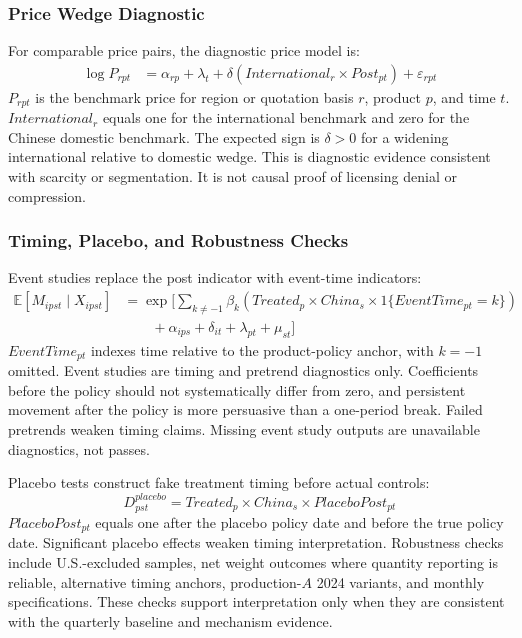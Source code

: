 \documentclass[12pt,a4paper]{article}
\numberwithin{equation}{section}
\begin{document}
\subsubsection{Price Wedge Diagnostic}

For comparable price pairs, the diagnostic price model is:
\begin{equation}
\begin{aligned}
\log P_{rpt}
&=\alpha_{rp}
+\lambda_t
+\delta\left(International_r\times Post_{pt}\right)
+\varepsilon_{rpt}
\end{aligned}
\end{equation}
\(P_{rpt}\) is the benchmark price for region or quotation basis \(r\), product \(p\), and time \(t\). \(International_r\) equals one for the international benchmark and zero for the Chinese domestic benchmark. The expected sign is \(\delta>0\) for a widening international relative to domestic wedge. This is diagnostic evidence consistent with scarcity or segmentation. It is not causal proof of licensing denial or compression.

\subsubsection{Timing, Placebo, and Robustness Checks}

Event studies replace the post indicator with event-time indicators:
\begin{equation}
\begin{aligned}
\mathbb{E}\left[M_{ipst}\mid X_{ipst}\right]
&=\exp\Biggl[
\sum_{k\neq -1}\beta_k
\left(Treated_p\times China_s\times 1\{EventTime_{pt}=k\}\right) \\
&\qquad
+\alpha_{ips}
+\delta_{it}
+\lambda_{pt}
+\mu_{st}
\Biggr]
\end{aligned}
\end{equation}
\(EventTime_{pt}\) indexes time relative to the product-policy anchor, with \(k=-1\) omitted. Event studies are timing and pretrend diagnostics only. Coefficients before the policy should not systematically differ from zero, and persistent movement after the policy is more persuasive than a one-period break. Failed pretrends weaken timing claims. Missing event study outputs are unavailable diagnostics, not passes.

Placebo tests construct fake treatment timing before actual controls:
\begin{equation}
D^{placebo}_{pst}=Treated_p\times China_s\times PlaceboPost_{pt}
\end{equation}
\(PlaceboPost_{pt}\) equals one after the placebo policy date and before the true policy date. Significant placebo effects weaken timing interpretation. Robustness checks include U.S.-excluded samples, net weight outcomes where quantity reporting is reliable, alternative timing anchors, production-\(A\) 2024 variants, and monthly specifications. These checks support interpretation only when they are consistent with the quarterly baseline and mechanism evidence.
\end{document}
